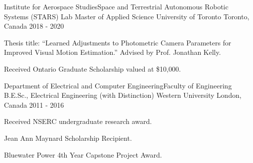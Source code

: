 

\begin{cventries}

  \cventry
    {Institute for Aerospace Studies{\enskip\cdotp\enskip}Space and Terrestrial Autonomous Robotic Systems (STARS) Lab} %
    {Master of Applied Science {\enskip\cdotp\enskip}University of Toronto} %
    {Toronto, Canada} %
    {2018 - 2020} %
    {
      \begin{cvitems} %
        \item {Thesis title: ``Learned Adjustments to Photometric Camera Parameters for Improved Visual Motion Estimation.'' Advised by Prof. Jonathan Kelly.}
        \item {Received Ontario Graduate Scholarship valued at \$10,000.}
      \end{cvitems}
    }

  \cventry
    {Department of Electrical and Computer Engineering{\enskip\cdotp\enskip}Faculty of Engineering} %
    {B.E.Sc., Electrical Engineering (with Distinction) {\enskip\cdotp\enskip}Western University} %
    {London, Canada} %
    {2011 - 2016} %
    {
      \begin{cvitems} %
        \item {Received NSERC undergraduate research award.}
        \item {Jean Ann Maynard Scholarship Recipient.}
        \item {Bluewater Power 4th Year Capstone Project Award.}
      \end{cvitems}
    }

\end{cventries}
